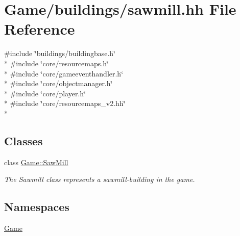 \hypertarget{sawmill_8hh}{\section{Game/buildings/sawmill.hh File Reference}
\label{sawmill_8hh}
}
{\ttfamily \#include \char`\"{}buildings/buildingbase.\-h\char`\"{}}\\*
{\ttfamily \#include \char`\"{}core/resourcemaps.\-h\char`\"{}}\\*
{\ttfamily \#include \char`\"{}core/gameeventhandler.\-h\char`\"{}}\\*
{\ttfamily \#include \char`\"{}core/objectmanager.\-h\char`\"{}}\\*
{\ttfamily \#include \char`\"{}core/player.\-h\char`\"{}}\\*
{\ttfamily \#include \char`\"{}core/resourcemaps\-\_\-v2.\-hh\char`\"{}}\\*
\subsection*{Classes}
\begin{DoxyCompactItemize}
\item 
class \hyperlink{classGame_1_1SawMill}{Game\-::\-Saw\-Mill}
\begin{DoxyCompactList}\small\item\em The Sawmill class represents a sawmill-\/building in the game. \end{DoxyCompactList}\end{DoxyCompactItemize}
\subsection*{Namespaces}
\begin{DoxyCompactItemize}
\item 
\hyperlink{namespaceGame}{Game}
\end{DoxyCompactItemize}
